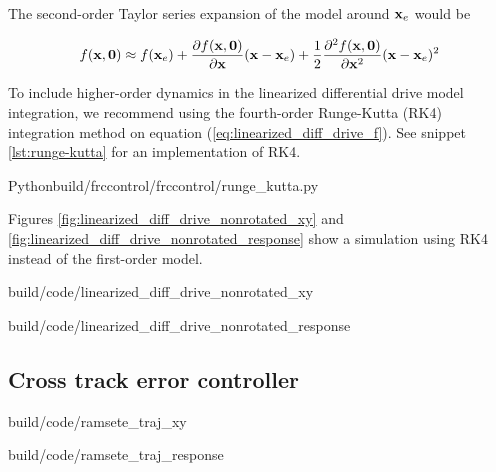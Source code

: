 The second-order Taylor series expansion of the \gls{model} around $\mathbf{x}_e$
would be

\begin{equation*}
  f(\mathbf{x}, \mathbf{0}) \approx f(\mathbf{x}_e) +
    \frac{\partial f(\mathbf{x}, \mathbf{0})}{\partial\mathbf{x}}(\mathbf{x} - \mathbf{x}_e) +
    \frac{1}{2}\frac{\partial^2 f(\mathbf{x}, \mathbf{0})}{\partial\mathbf{x}^2}
    (\mathbf{x} - \mathbf{x}_e)^2
\end{equation*}

To include higher-order dynamics in the linearized differential drive model
integration, we recommend using the fourth-order Runge-Kutta (RK4) integration
method on equation (\ref{eq:linearized_diff_drive_f}). See snippet
\ref{lst:runge-kutta} for an implementation of RK4.

\begin{code}{Python}{build/frccontrol/frccontrol/runge_kutta.py}
  \caption{Fourth-order Runge-Kutta integration in Python}
  \label{lst:runge-kutta}
\end{code}

Figures \ref{fig:linearized_diff_drive_nonrotated_xy} and
\ref{fig:linearized_diff_drive_nonrotated_response} show a simulation using RK4
instead of the first-order \gls{model}.

\begin{bookfigure}
  \begin{minisvg}{build/code/linearized_diff_drive_nonrotated_xy}
    \caption{Linearized differential drive controller (global reference frame
      formulation) x-y plot}
    \label{fig:linearized_diff_drive_nonrotated_xy}
  \end{minisvg}
  \hfill
  \begin{minisvg}{build/code/linearized_diff_drive_nonrotated_response}
    \caption{Linearized differential drive controller (global reference frame
      formulation) response}
    \label{fig:linearized_diff_drive_nonrotated_response}
  \end{minisvg}
\end{bookfigure}

\subsection{Cross track error controller}

\begin{bookfigure}
  \begin{minisvg}{build/code/ramsete_traj_xy}
    \caption{Ramsete nonlinear controller x-y plot}
    \label{fig:ramsete_traj_xy2}
  \end{minisvg}
  \hfill
  \begin{minisvg}{build/code/ramsete_traj_response}
    \caption{Ramsete nonlinear controller response}
    \label{fig:ramsete_traj_response2}
  \end{minisvg}
\end{bookfigure}

